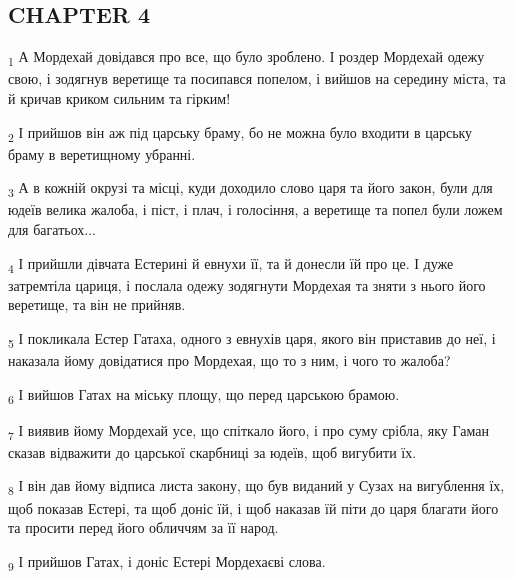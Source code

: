 \subsection{CHAPTER 4}
\begin{tcolorbox}
\textsubscript{1} А Мордехай довідався про все, що було зроблено. І роздер Мордехай одежу свою, і зодягнув веретище та посипався попелом, і вийшов на середину міста, та й кричав криком сильним та гірким!
\end{tcolorbox}
\begin{tcolorbox}
\textsubscript{2} І прийшов він аж під царську браму, бо не можна було входити в царську браму в веретищному убранні.
\end{tcolorbox}
\begin{tcolorbox}
\textsubscript{3} А в кожній окрузі та місці, куди доходило слово царя та його закон, були для юдеїв велика жалоба, і піст, і плач, і голосіння, а веретище та попел були ложем для багатьох...
\end{tcolorbox}
\begin{tcolorbox}
\textsubscript{4} І прийшли дівчата Естерині й евнухи її, та й донесли їй про це. І дуже затремтіла цариця, і послала одежу зодягнути Мордехая та зняти з нього його веретище, та він не прийняв.
\end{tcolorbox}
\begin{tcolorbox}
\textsubscript{5} І покликала Естер Гатаха, одного з евнухів царя, якого він приставив до неї, і наказала йому довідатися про Мордехая, що то з ним, і чого то жалоба?
\end{tcolorbox}
\begin{tcolorbox}
\textsubscript{6} І вийшов Гатах на міську площу, що перед царською брамою.
\end{tcolorbox}
\begin{tcolorbox}
\textsubscript{7} І виявив йому Мордехай усе, що спіткало його, і про суму срібла, яку Гаман сказав відважити до царської скарбниці за юдеїв, щоб вигубити їх.
\end{tcolorbox}
\begin{tcolorbox}
\textsubscript{8} І він дав йому відписа листа закону, що був виданий у Сузах на вигублення їх, щоб показав Естері, та щоб доніс їй, і щоб наказав їй піти до царя благати його та просити перед його обличчям за її народ.
\end{tcolorbox}
\begin{tcolorbox}
\textsubscript{9} І прийшов Гатах, і доніс Естері Мордехаєві слова.
\end{tcolorbox}
